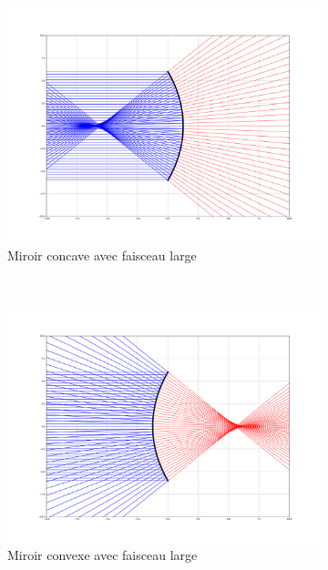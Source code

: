 \documentclass[a4paper, 11pt]{article}
\begin{document}
\begin{figure}[H]
    \centering
    \begin{subfigure}[t]{0.45\linewidth}
    	\centering
		\includegraphics[width=\linewidth]{Figures/Figures_miroirs/conc_pastig.pdf}
		\caption{Miroir concave avec faisceau large}
		\label{fig:conc_pastig} 
    \end{subfigure}
    ~
    \begin{subfigure}[t]{0.45\linewidth}
    	\centering
		\includegraphics[width=\linewidth]{Figures/Figures_miroirs/conv_pastig.pdf}
		\caption{Miroir convexe avec faisceau large}
		\label{fig:conv_pastig} 
    \end{subfigure}
\hfill
    \begin{subfigure}[t]{0.45\linewidth}

\end{subfigure}
\end{figure}
\end{document}
